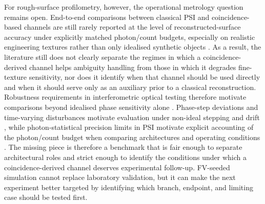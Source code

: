 \documentclass[photonics,article,submit,pdftex,moreauthors]{Definitions/mdpi}
\begin{document}
For rough-surface profilometry, however, the operational metrology question remains open. End-to-end comparisons between classical PSI and coincidence-based channels are still rarely reported at the level of reconstructed-surface accuracy under explicitly matched photon/count budgets, especially on realistic engineering textures rather than only idealised synthetic objects \cite{Zhang2022,Kotsiuba2018207}. As a result, the literature still does not clearly separate the regimes in which a coincidence-derived channel helps ambiguity handling from those in which it degrades fine-texture sensitivity, nor does it identify when that channel should be used directly and when it should serve only as an auxiliary prior to a classical reconstruction. 
Robustness requirements in interferometric optical testing therefore motivate comparisons beyond idealised phase sensitivity alone \cite{McDonnell2020}. Phase-step deviations and time-varying disturbances motivate evaluation under non-ideal stepping and drift \cite{Ri2020}, while photon-statistical precision limits in PSI motivate explicit accounting of the photon/count budget when comparing architectures and operating conditions \cite{Okamoto2021}. The missing piece is therefore a benchmark that is fair enough to separate architectural roles and strict enough to identify the conditions under which a coincidence-derived channel deserves experimental follow-up. FV-seeded simulation cannot replace laboratory validation, but it can make the next experiment better targeted by identifying which branch, endpoint, and limiting case should be tested first.
\end{document}
